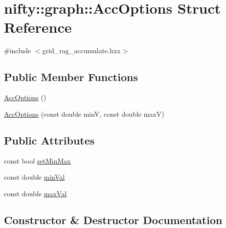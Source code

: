 \hypertarget{structnifty_1_1graph_1_1AccOptions}{}\section{nifty\+:\+:graph\+:\+:Acc\+Options Struct Reference}
\label{structnifty_1_1graph_1_1AccOptions}


{\ttfamily \#include $<$grid\+\_\+rag\+\_\+accumulate.\+hxx$>$}

\subsection*{Public Member Functions}
\begin{DoxyCompactItemize}
\item 
\hyperlink{structnifty_1_1graph_1_1AccOptions_a462e72243b955651f310d48070d68b28}{Acc\+Options} ()
\item 
\hyperlink{structnifty_1_1graph_1_1AccOptions_a4d1c57ba781c622d500d5582045c73da}{Acc\+Options} (const double minV, const double maxV)
\end{DoxyCompactItemize}
\subsection*{Public Attributes}
\begin{DoxyCompactItemize}
\item 
const bool \hyperlink{structnifty_1_1graph_1_1AccOptions_ae8a2b6438127dc9241b04df430d7e531}{set\+Min\+Max}
\item 
const double \hyperlink{structnifty_1_1graph_1_1AccOptions_aa798ef8ea78550c5a80de88d34be1914}{min\+Val}
\item 
const double \hyperlink{structnifty_1_1graph_1_1AccOptions_ae8618543bed08e12468fca11848b7bec}{max\+Val}
\end{DoxyCompactItemize}


\subsection{Constructor \& Destructor Documentation}
\mbox{\label{structnifty_1_1graph_1_1AccOptions_a462e72243b955651f310d48070d68b28}} 
